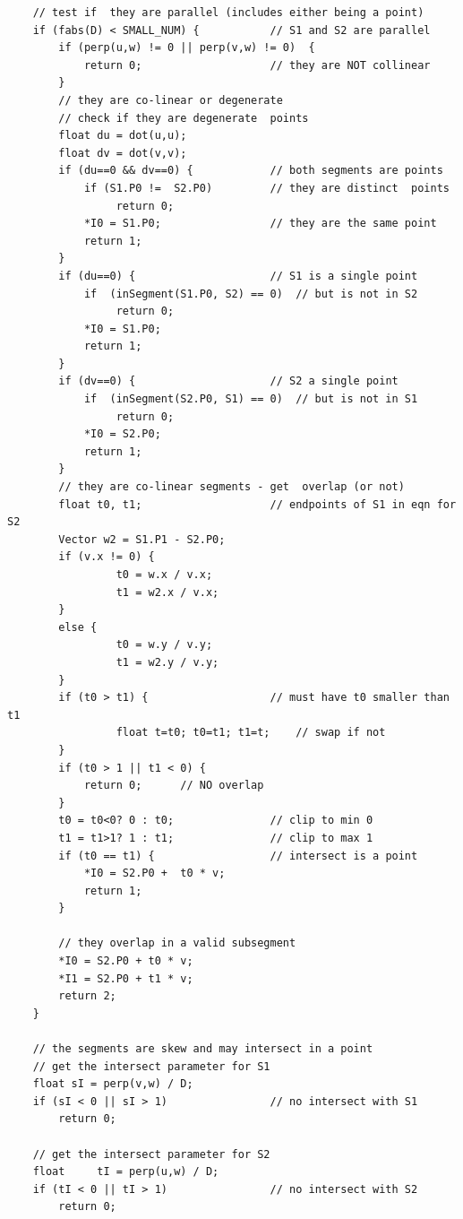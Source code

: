 \documentclass[12pt]{article}
\begin{document}
\begin{lstlisting}
    // test if  they are parallel (includes either being a point)
    if (fabs(D) < SMALL_NUM) {           // S1 and S2 are parallel
        if (perp(u,w) != 0 || perp(v,w) != 0)  {
            return 0;                    // they are NOT collinear
        }
        // they are co-linear or degenerate
        // check if they are degenerate  points
        float du = dot(u,u);
        float dv = dot(v,v);
        if (du==0 && dv==0) {            // both segments are points
            if (S1.P0 !=  S2.P0)         // they are distinct  points
                 return 0;
            *I0 = S1.P0;                 // they are the same point
            return 1;
        }
        if (du==0) {                     // S1 is a single point
            if  (inSegment(S1.P0, S2) == 0)  // but is not in S2
                 return 0;
            *I0 = S1.P0;
            return 1;
        }
        if (dv==0) {                     // S2 a single point
            if  (inSegment(S2.P0, S1) == 0)  // but is not in S1
                 return 0;
            *I0 = S2.P0;
            return 1;
        }
        // they are co-linear segments - get  overlap (or not)
        float t0, t1;                    // endpoints of S1 in eqn for S2
        Vector w2 = S1.P1 - S2.P0;
        if (v.x != 0) {
                 t0 = w.x / v.x;
                 t1 = w2.x / v.x;
        }
        else {
                 t0 = w.y / v.y;
                 t1 = w2.y / v.y;
        }
        if (t0 > t1) {                   // must have t0 smaller than t1
                 float t=t0; t0=t1; t1=t;    // swap if not
        }
        if (t0 > 1 || t1 < 0) {
            return 0;      // NO overlap
        }
        t0 = t0<0? 0 : t0;               // clip to min 0
        t1 = t1>1? 1 : t1;               // clip to max 1
        if (t0 == t1) {                  // intersect is a point
            *I0 = S2.P0 +  t0 * v;
            return 1;
        }

        // they overlap in a valid subsegment
        *I0 = S2.P0 + t0 * v;
        *I1 = S2.P0 + t1 * v;
        return 2;
    }

    // the segments are skew and may intersect in a point
    // get the intersect parameter for S1
    float sI = perp(v,w) / D;
    if (sI < 0 || sI > 1)                // no intersect with S1
        return 0;

    // get the intersect parameter for S2
    float     tI = perp(u,w) / D;
    if (tI < 0 || tI > 1)                // no intersect with S2
        return 0;


\end{lstlisting}
\end{document}
